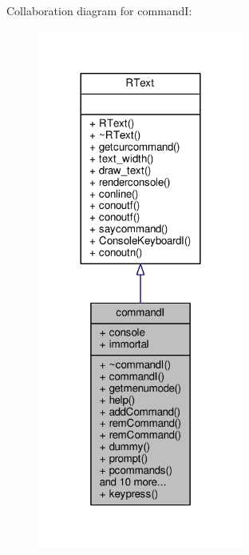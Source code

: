 Collaboration diagram for commandI\+:
\nopagebreak
\begin{figure}[H]
\begin{center}
\leavevmode
\includegraphics[width=192pt]{d7/d43/classcommandI__coll__graph}
\end{center}
\end{figure}
